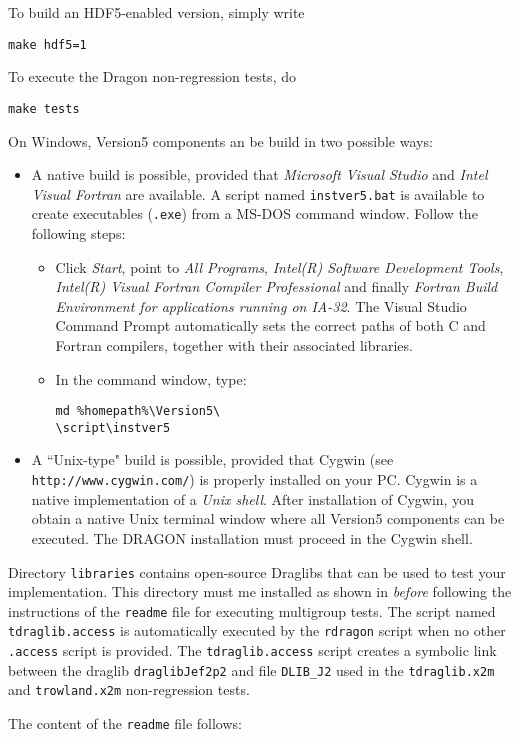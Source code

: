 \noindent To build an HDF5-enabled version, simply write
\begin{verbatim}
make hdf5=1
\end{verbatim}

\noindent To execute the Dragon non-regression tests, do
\begin{verbatim}
make tests
\end{verbatim}

\vskip 0.08cm

On Windows, Version5 components an be build in two possible ways:
\begin{itemize}
\item  A native build is possible, provided that {\sl Microsoft Visual Studio} and {\sl Intel Visual Fortran} are available.
A script named {\tt instver5.bat} is available to create executables ({\tt .exe}) from a MS-DOS command
window. Follow the following steps:
\begin{itemize}
\item Click {\sl Start}, point to {\sl All Programs}, {\sl Intel(R) Software Development Tools}, {\sl Intel(R) Visual Fortran
Compiler Professional} and finally {\sl Fortran Build Environment for applications running on IA-32}. The Visual Studio Command Prompt
automatically sets the correct paths of both C and Fortran compilers, together with their associated libraries.
\item In the command window, type: \\
\noindent \begin{verbatim}
md %homepath%\Version5\
\script\instver5
\end{verbatim}
\end{itemize}
\item  A ``Unix-type" build is possible, provided that Cygwin (see {\tt http://www.cygwin.com/}) is properly installed on your PC. Cygwin is a
native implementation of a {\sl Unix shell}. After installation of
Cygwin, you obtain a native Unix
terminal window where all Version5 components can be executed. The DRAGON installation must proceed
in the Cygwin shell.
\end{itemize}

\vskip 0.08cm

Directory {\tt libraries} contains open-source Draglibs that can be used to
test your implementation. This directory must me installed as shown in 
{\sl before} following the instructions of the {\tt readme} file for executing
multigroup tests. The script named
{\tt tdraglib.access} is automatically executed by the {\tt rdragon} script when
no other {\tt *.access} script is provided. The {\tt tdraglib.access} script creates
a symbolic link between the draglib {\tt draglibJef2p2} and file {\tt DLIB\_J2}
used in the {\tt tdraglib.x2m} and {\tt trowland.x2m} non-regression tests.

\vskip 0.08cm

The content of the {\tt readme} file follows:

